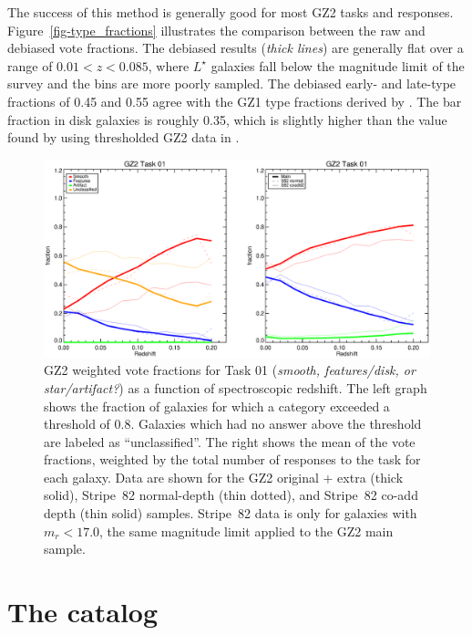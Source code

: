 \documentclass[useAMS,usenatbib]{mn2e}
\begin{document}
The success of this method is generally good for most GZ2 tasks and responses. Figure~\ref{fig-type_fractions} illustrates the comparison between the raw and debiased vote fractions. The debiased results ({\it thick lines}) are generally flat over a range of $0.01<z<0.085$, where $L^\star$ galaxies \citep[$M_r\sim-20.44$;][]{bla03a} fall below the magnitude limit of the survey and the bins are more poorly sampled. The debiased early- and late-type fractions of 0.45 and 0.55 agree with the GZ1 type fractions derived by \citet{bam09}. The bar fraction in disk galaxies is roughly 0.35, which is slightly higher than the value found by using thresholded GZ2 data in \citet{mas11c}.

\begin{figure}
\includegraphics[angle=0,width=7.0in]{figures/gz2_bias_demo_task01.ps}
\caption{GZ2 weighted vote fractions for Task 01 ({\it smooth, features/disk, or star/artifact?}) as a function of spectroscopic redshift. The left graph shows the fraction of galaxies for which a category exceeded a threshold of 0.8. Galaxies which had no answer above the threshold are labeled as ``unclassified''. The right shows the mean of the vote fractions, weighted by the total number of responses to the task for each galaxy. Data are shown for the GZ2 original + extra (thick solid), Stripe~82 normal-depth (thin dotted), and Stripe~82 co-add depth (thin solid) samples. Stripe~82 data is only for galaxies with $m_r < 17.0$, the same magnitude limit applied to the GZ2 main sample.  
\label{fig-task01}}
\end{figure}


\section{The catalog} \label{sec-catalog}
\end{document}

